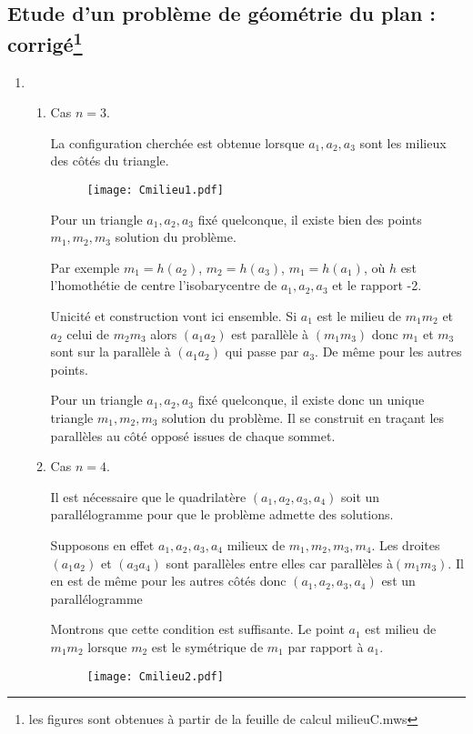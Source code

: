 \subsection*{Etude d'un problème de géométrie du plan : corrigé\footnote {les figures sont obtenues à partir de la feuille de calcul milieuC.mws}}
\begin{enumerate}
\item \begin{enumerate}
\item
Cas $n=3$.

La configuration cherchée est obtenue lorsque $a_{1},a_{2},a_{3}$ sont les milieux des côtés du triangle.
\begin{figure}
   \centering
   \texttt{[image: Cmilieu1.pdf]}
\end{figure}

Pour un triangle $a_{1},a_{2},a_{3}$ fixé quelconque, il existe bien des points $m_{1},m_{2},m_{3}$ solution du problème.

Par exemple
$m_{1}=h(a_{2})$, $m_{2}=h(a_{3})$, $m_{1}=h(a_{1})$, où $h$ est l'homothétie de centre l'isobarycentre de $a_{1},a_{2},a_{3}$ et le rapport -2.

Unicité et construction vont ici ensemble. Si $a_{1}$ est le milieu de $m_{1}m_{2}$ et $a_{2}$ celui de $m_{2}m_{3}$ alors $(a_{1}a_{2})$ est parallèle à $(m_{1}m_{3})$ donc $m_{1}$ et $m_{3}$ sont sur la parallèle à $(a_{1}a_{2})$ qui passe par $a_{3}$. De même pour les autres points.

Pour un triangle $a_{1},a_{2},a_{3}$ fixé quelconque, il existe donc un unique triangle $m_{1},m_{2},m_{3}$ solution du problème. Il se construit en traçant les parallèles au côté opposé issues de chaque sommet.

\item
Cas $n=4$.

Il est nécessaire que le quadrilatère $ (a_{1},a_{2}, a_{3},a_{4})$ soit un parallélogramme pour que le problème admette des solutions.

Supposons en effet $a_{1},a_{2},a_{3},a_{4}$ milieux de $m_{1},m_{2},m_{3},m_{4}$. Les droites $ (a_{1}a_{2})$ et $ (a_{3}a_{4})$ sont parallèles entre elles car parallèles à$ (m_{1}m_{3})$. Il en est de même pour les autres côtés donc $ (a_{1},a_{2}, a_{3},a_{4})$ est un parallélogramme

Montrons que cette condition est suffisante. Le point $a_{1}$ est milieu de $m_{1}m_{2}$ lorsque $m_{2}$ est le symétrique de $m_{1}$ par rapport à $a_{1}$.
\begin{figure}
   \centering
   \texttt{[image: Cmilieu2.pdf]}
\end{figure}


\end{enumerate}
\end{enumerate}
